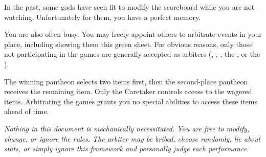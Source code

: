 \documentclass[green]{guardians}
\begin{document}
In the past, some gods have seen fit to modify the scoreboard while you are not watching. Unfortunately for them, you have a perfect memory.

You are also often busy. You may freely appoint others to arbitrate events in your place, including showing them this green sheet. For obvious reasons, only those not participating in the games are generally accepted as arbiters (\cAmaterasu{}, \cKachiko{}, \cJascha{}, the \cCaretaker{}, or the \cWarden{}).

The winning pantheon selects two items first, then the second-place pantheon receives the remaining item. Only the Caretaker controls access to the wagered items. Arbitrating the games grants you no special abilities to access these items ahead of time.

\emph{Nothing in this document is mechanically necessitated. You are free to modify, change, or ignore the rules. The arbiter may be bribed, choose randomly, lie about stats, or simply ignore this framework and personally judge each performance.}
\end{document}
